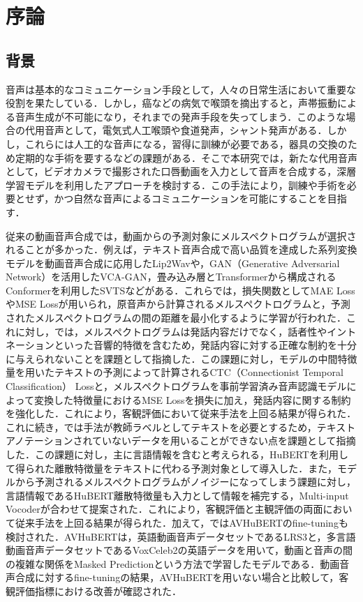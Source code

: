 \section{序論}
\subsection{背景}
音声は基本的なコミュニケーション手段として，人々の日常生活において重要な役割を果たしている．しかし，癌などの病気で喉頭を摘出すると，声帯振動による音声生成が不可能になり，それまでの発声手段を失ってしまう．このような場合の代用音声として，電気式人工喉頭や食道発声，シャント発声がある．しかし，これらには人工的な音声になる，習得に訓練が必要である，器具の交換のため定期的な手術を要するなどの課題がある．そこで本研究では，新たな代用音声として，ビデオカメラで撮影された口唇動画を入力として音声を合成する，深層学習モデルを利用したアプローチを検討する．この手法により，訓練や手術を必要とせず，かつ自然な音声によるコミュニケーションを可能にすることを目指す．

従来の動画音声合成では，動画からの予測対象にメルスペクトログラムが選択されることが多かった．例えば，テキスト音声合成で高い品質を達成した系列変換モデル\cite{shen2018natural}を動画音声合成に応用したLip2Wav\cite{prajwal2020learning}や，GAN（Generative Adversarial Network）を活用したVCA-GAN\cite{kim2021lip}，畳み込み層とTransformer\cite{vaswani2017attention}から構成されるConformer\cite{gulati2020conformer}を利用したSVTS\cite{mira2022svts}などがある．これらでは，損失関数としてMAE LossやMSE Lossが用いられ，原音声から計算されるメルスペクトログラムと，予測されたメルスペクトログラムの間の距離を最小化するように学習が行われた．これに対し，\cite{kim2023lip_multitask}では，メルスペクトログラムは発話内容だけでなく，話者性やイントネーションといった音響的特徴を含むため，発話内容に対する正確な制約を十分に与えられないことを課題として指摘した．この課題に対し，モデルの中間特徴量を用いたテキストの予測によって計算されるCTC（Connectionist Temporal Classification） Lossと，メルスペクトログラムを事前学習済み音声認識モデルによって変換した特徴量におけるMSE Lossを損失に加え，発話内容に関する制約を強化した．これにより，客観評価において従来手法を上回る結果が得られた．これに続き，\cite{choi2023intelligible}では手法\cite{kim2023lip_multitask}が教師ラベルとしてテキストを必要とするため，テキストアノテーションされていないデータを用いることができない点を課題として指摘した．この課題に対し，主に言語情報を含むと考えられる，HuBERT\cite{hsu2021hubert}を利用して得られた離散特徴量をテキストに代わる予測対象として導入した．また，モデルから予測されるメルスペクトログラムがノイジーになってしまう課題に対し，言語情報であるHuBERT離散特徴量も入力として情報を補完する，Multi-input Vocoderが合わせて提案された．これにより，客観評価と主観評価の両面において従来手法を上回る結果が得られた．加えて，\cite{choi2023intelligible}ではAVHuBERT\cite{shi2022learning}のfine-tuningも検討された．AVHuBERTは，英語動画音声データセットであるLRS3\cite{afouras2018lrs3}と，多言語動画音声データセットであるVoxCeleb2\cite{chung2018voxceleb2}の英語データを用いて，動画と音声の間の複雑な関係をMasked Predictionという方法で学習したモデルである．動画音声合成に対するfine-tuningの結果，AVHuBERTを用いない場合と比較して，客観評価指標における改善が確認された．


